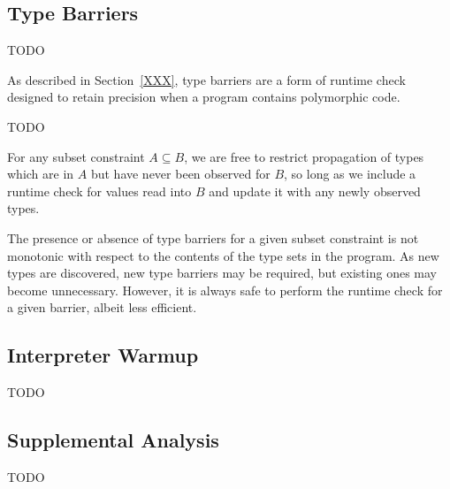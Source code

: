 \subsection{Type Barriers}

TODO

As described in Section~\ref{XXX}, type barriers are a form of runtime
check designed to retain precision when a program contains polymorphic code.

TODO

For any subset constraint $A \subseteq B$, we are free to restrict
propagation of types which are in $A$ but have never been observed for $B$,
so long as we include a runtime check for values read into $B$ and update
it with any newly observed types.

The presence or absence of type barriers for a given subset constraint
is not monotonic with respect to the contents of the type sets in the program.
As new types are discovered, new type barriers may be required, but existing
ones may become unnecessary.
However, it is always safe to perform the runtime check for a given barrier,
albeit less efficient.

\subsection{Interpreter Warmup}

TODO

\subsection{Supplemental Analysis}

TODO
